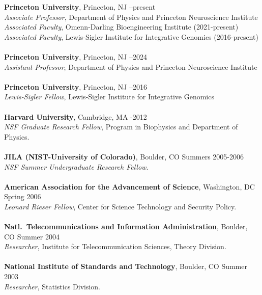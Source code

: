\documentclass[11pt]{article}
\begin{document}
{\bf Princeton University}, Princeton, NJ  --present\\
{\it Associate Professor}, Department of Physics and Princeton
Neuroscience Institute \\
{\it Associated Faculty},  Omenn-Darling Bioengineering Institute (2021-present) \\ %
{\it Associated Faculty}, Lewis-Sigler Institute for Integrative Genomics  (2016-present) \\ %
\\
{\bf Princeton University}, Princeton, NJ  --2024\\
{\it Assistant Professor}, Department of Physics and Princeton
Neuroscience Institute \\
\\
{\bf Princeton University}, Princeton, NJ  --2016\\
{\it Lewis-Sigler Fellow}, Lewis-Sigler Institute for Integrative Genomics\\ 
\\
{\bf Harvard University}, 
Cambridge, MA  -2012\\
{\it NSF Graduate Research Fellow}, Program in Biophysics and Department of Physics.\\
\\
{\bf JILA (NIST-University of Colorado)}, Boulder, CO   \dotfill Summers 2005-2006\\
{\it NSF Summer Undergraduate Research Fellow}.\\
\\
{\bf American Association for the Advancement of Science}, Washington, DC  \dotfill Spring 2006\\
{\it Leonard Rieser Fellow}, Center for Science Technology and Security Policy.\\
\\
{\bf Natl.~Telecommunications and Information Administration}, Boulder, CO  \dotfill Summer 2004\\
{\it Researcher}, Institute for Telecommunication Sciences, Theory Division.\\
\\
{\bf National Institute of Standards and Technology}, Boulder, CO  \dotfill Summer 2003\\
{\it Researcher}, Statistics Division.\\
\end{document}
